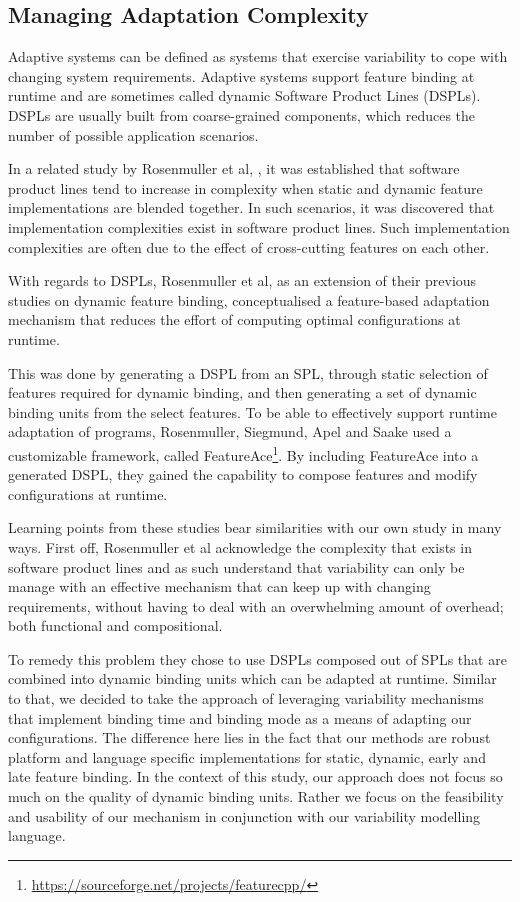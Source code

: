 \documentclass[conference]{IEEEtran}
\newcommand{\foot}[1]{\footnote{\url{#1}}}
\begin{document}
\subsection{Managing Adaptation Complexity}
Adaptive systems can be defined as systems that exercise variability to cope with changing system requirements. Adaptive systems support feature binding at runtime and are sometimes called dynamic Software Product Lines (DSPLs). DSPLs are usually built from coarse-grained components, which reduces the number of possible application scenarios. 

In a related study by Rosenmuller et al, \cite{fmod-lang-scenarios}, it was established that software product lines tend to increase in complexity when static and dynamic feature implementations are blended together. In such scenarios, it was discovered that implementation complexities exist in software product lines. Such implementation complexities are often due to the effect of cross-cutting features on each other.

With regards to DSPLs, Rosenmuller et al, as an extension of their previous studies on dynamic feature binding, \cite{tailor-spl} conceptualised a feature-based adaptation mechanism that reduces the effort of computing optimal configurations at runtime.

This was done by generating a DSPL from an SPL, through static selection of features required for dynamic binding, and then generating a set of dynamic binding units from the select features. To be able to effectively support runtime adaptation of programs, Rosenmuller, Siegmund, Apel and Saake used a customizable framework, called FeatureAce\foot{https://sourceforge.net/projects/featurecpp/}. By including FeatureAce into a generated DSPL, they gained the capability to compose features and modify configurations at runtime.

Learning points from these studies bear similarities with our own study in many ways. First off, Rosenmuller et al\cite{tailor-spl} acknowledge the complexity that exists in software product lines and as such understand that variability can only be manage with an effective mechanism that can keep up with changing requirements, without having to deal with an overwhelming amount of overhead; both functional and compositional.

To remedy this problem they chose to use DSPLs composed out of SPLs that are combined into dynamic binding units which can be adapted at runtime. Similar to that, we decided to take the approach of leveraging variability mechanisms that implement binding time and binding mode as a means of adapting our configurations. The difference here lies in the fact that our methods are robust platform and language specific implementations for static, dynamic, early and late feature binding. In the context of this study, our approach does not focus so much on the quality of dynamic binding units. Rather we focus on the feasibility and usability of our mechanism in conjunction with our variability modelling language.
 
\end{document}
